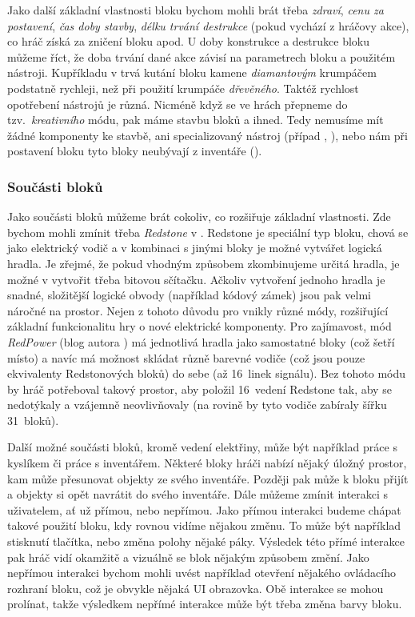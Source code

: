 Jako další základní vlastnosti bloku bychom mohli brát třeba \textit{zdraví}, \textit{cenu za postavení}, \textit{čas doby stavby}, \textit{délku trvání destrukce} (pokud vychází z hráčovy akce), co hráč získá za zničení bloku apod. U doby konstrukce a destrukce bloku můžeme říct, že doba trvání dané akce závisí na parametrech bloku a použitém nástroji. Kupříkladu v  trvá kutání bloku kamene \textit{diamantovým} krumpáčem podstatně rychleji, než při použití krumpáče \textit{dřevěného}. Taktéž rychlost opotřebení nástrojů je různá. Nicméně když se ve hrách přepneme do tzv.~\textit{kreativního} módu, pak máme stavbu bloků  a ihned. Tedy nemusíme mít žádné komponenty ke stavbě, ani specializovaný nástroj (případ \SE{}, \ME{}), nebo nám při postavení bloku tyto bloky neubývají z inventáře (\MC{}). 

\subsubsection{Součásti bloků}
Jako součásti bloků můžeme brát cokoliv, co rozšiřuje základní vlastnosti. Zde bychom mohli zmínit třeba \textit{Redstone} v . Redstone je speciální typ bloku, chová se jako elektrický vodič a v kombinaci s jinými bloky je možné vytvářet logická hradla. Je zřejmé, že pokud vhodným způsobem zkombinujeme určitá hradla, je možné v  vytvořit třeba bitovou sčítačku. Ačkoliv vytvoření jednoho hradla je snadné, složitější logické obvody (například kódový zámek) jsou pak velmi náročné na prostor. Nejen z tohoto důvodu pro \MC{} vnikly různé módy, rozšiřující základní funkcionalitu hry o nové elektrické komponenty. Pro zajímavost, mód \textit{RedPower} (blog autora \citep{eloraam}) má jednotlivá hradla jako samostatné bloky (což šetří místo) a navíc má možnost skládat různě barevné vodiče (což jsou pouze ekvivalenty Redstonových bloků) do sebe (až 16~linek signálu). Bez tohoto módu by hráč potřeboval takový prostor, aby položil 16~vedení Redstone tak, aby se nedotýkaly a vzájemně neovlivňovaly (na rovině by tyto vodiče zabíraly šířku 31~bloků). 

Další možné součásti bloků, kromě vedení elektřiny, může být například práce s kyslíkem či práce s inventářem. Některé bloky hráči nabízí nějaký úložný prostor, kam může přesunovat objekty ze svého inventáře. Později pak může k bloku přijít a objekty si opět navrátit do svého inventáře. 
Dále můžeme zmínit interakci s uživatelem, ať už přímou, nebo nepřímou. Jako přímou interakci budeme chápat takové použití bloku, kdy rovnou vidíme nějakou změnu. To může být například stisknutí tlačítka, nebo změna polohy nějaké páky. Výsledek této přímé interakce pak hráč vidí okamžitě a vizuálně se blok nějakým způsobem změní. Jako nepřímou interakci bychom mohli uvést například otevření nějakého ovládacího rozhraní bloku, což je obvykle nějaká UI obrazovka. Obě interakce se mohou prolínat, takže výsledkem nepřímé interakce může být třeba změna barvy bloku.


